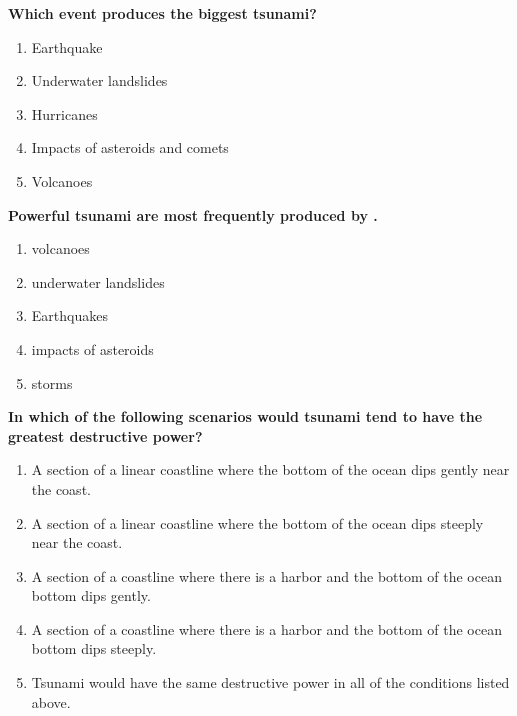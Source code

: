 \item {
\setlength{\itemsep}{0cm}
\setlength{\parskip}{.2cm}
\begin{samepage}
\textbf{
Which event produces the biggest tsunami?
}
\begin{enumerate}
\item { 	Earthquake }
\item { 	Underwater landslides }
\item { 	Hurricanes }
\item { 	Impacts of asteroids and comets }
\item { 	Volcanoes 		 }
\end{enumerate}
\end{samepage}
}
\item {
\setlength{\itemsep}{0cm}
\setlength{\parskip}{.2cm}
\begin{samepage}
\textbf{
Powerful tsunami are most frequently produced by \makebox[1cm]{\Rivpt\hrulefill\Rivpt}.
}
\begin{enumerate}
\item { 	volcanoes }
\item { 	underwater landslides }
\item { 	Earthquakes }
\item { 	impacts of asteroids }
\item { 	storms 		 }
\end{enumerate}
\end{samepage}
}
\item {
\setlength{\itemsep}{0cm}
\setlength{\parskip}{.2cm}
\begin{samepage}
\textbf{
In which of the following scenarios would tsunami tend to have the greatest destructive power?
}
\begin{enumerate}
\item { 	A section of a linear coastline where the bottom of the ocean dips gently near the coast. }
\item { 	A section of a linear coastline where the bottom of the ocean dips steeply near the coast. }
\item { 	A section of a coastline where there is a harbor and the bottom of the ocean bottom dips gently. }
\item { 	A section of a coastline where there is a harbor and the bottom of the ocean bottom dips steeply. }
\item { 	Tsunami would have the same destructive power in all of the conditions listed above. }
\end{enumerate}
\end{samepage}
}
